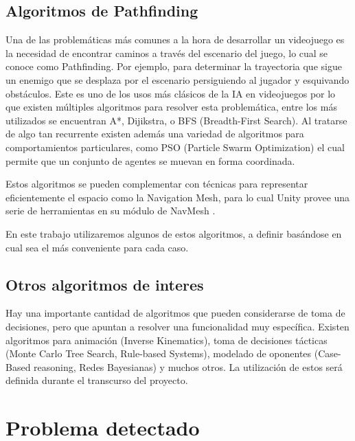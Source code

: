 \documentclass{article}
\begin{document}
\subsection{Algoritmos de Pathfinding}

Una de las problemáticas más comunes a la hora de desarrollar un videojuego es la necesidad de encontrar caminos a través del escenario del juego, lo cual se conoce como Pathfinding. Por ejemplo, para determinar la trayectoria que sigue un enemigo que se desplaza por el escenario persiguiendo al jugador y esquivando obstáculos. Este es uno de los usos más clásicos de la IA en videojuegos por lo que existen múltiples algoritmos para resolver esta problemática, entre los más utilizados se encuentran A*, Dijikstra, o BFS (Breadth-First Search). Al tratarse de algo tan recurrente existen además una variedad de algoritmos para comportamientos particulares, como PSO (Particle Swarm Optimization) el cual permite que un conjunto de agentes se muevan en forma coordinada.

Estos algoritmos se pueden complementar con técnicas para representar eficientemente el espacio como la Navigation Mesh, para lo cual Unity provee una serie de herramientas en su módulo de NavMesh \cite{unity_artificial_intelligence_programming}.

En este trabajo utilizaremos algunos de estos algoritmos, a definir basándose en cual sea el más conveniente para cada caso.

\subsection{Otros algoritmos de interes}
Hay una importante cantidad de algoritmos que pueden considerarse de toma de decisiones, pero que apuntan a resolver una funcionalidad muy específica. Existen algoritmos para animación (Inverse Kinematics), toma de decisiones tácticas (Monte Carlo Tree Search, Rule-based Systems), modelado de oponentes (Case-Based reasoning, Redes Bayesianas) y muchos otros. La utilización de estos será definida durante el transcurso del proyecto.

\section{Problema detectado}
\end{document}
